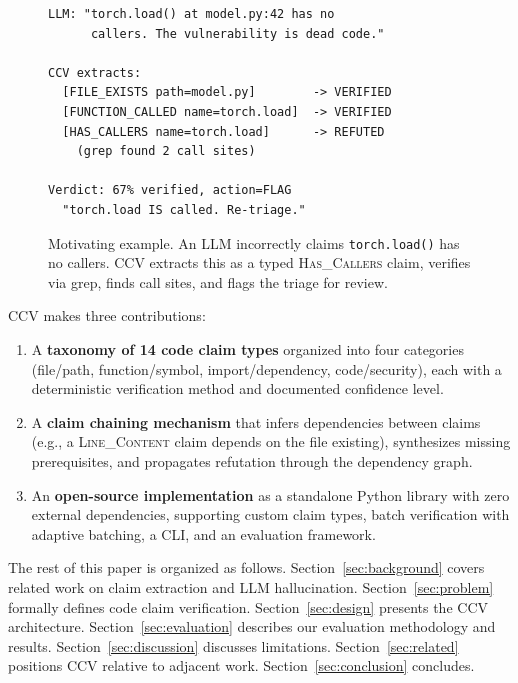 \begin{figure}[t]
\centering
\small
\begin{verbatim}
LLM: "torch.load() at model.py:42 has no
      callers. The vulnerability is dead code."

CCV extracts:
  [FILE_EXISTS path=model.py]        -> VERIFIED
  [FUNCTION_CALLED name=torch.load]  -> VERIFIED
  [HAS_CALLERS name=torch.load]      -> REFUTED
    (grep found 2 call sites)

Verdict: 67% verified, action=FLAG
  "torch.load IS called. Re-triage."
\end{verbatim}
\caption{Motivating example. An LLM incorrectly claims \texttt{torch.load()} has no callers. CCV extracts this as a typed \textsc{Has\_Callers} claim, verifies via grep, finds call sites, and flags the triage for review.}
\label{fig:motivating}
\end{figure}

CCV makes three contributions:

\begin{enumerate}
    \item A \textbf{taxonomy of 14 code claim types} organized into four categories (file/path, function/symbol, import/dependency, code/security), each with a deterministic verification method and documented confidence level.

    \item A \textbf{claim chaining mechanism} that infers dependencies between claims (e.g., a \textsc{Line\_Content} claim depends on the file existing), synthesizes missing prerequisites, and propagates refutation through the dependency graph.

    \item An \textbf{open-source implementation} as a standalone Python library with zero external dependencies, supporting custom claim types, batch verification with adaptive batching, a CLI, and an evaluation framework.
\end{enumerate}

The rest of this paper is organized as follows. Section~\ref{sec:background} covers related work on claim extraction and LLM hallucination. Section~\ref{sec:problem} formally defines code claim verification. Section~\ref{sec:design} presents the CCV architecture. Section~\ref{sec:evaluation} describes our evaluation methodology and results. Section~\ref{sec:discussion} discusses limitations. Section~\ref{sec:related} positions CCV relative to adjacent work. Section~\ref{sec:conclusion} concludes.
